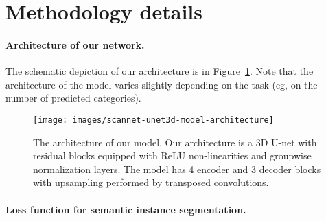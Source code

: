 \section{Methodology details}
\label{supsec:methods-detail}



\paragraph{Architecture of our network. }
\label{methods:network-arch-detail}
The schematic depiction of our architecture is in Figure~\ref{fig:architecture}. Note that the architecture of the model varies slightly depending on the task (eg, on the number of predicted categories). 


\begin{figure}[!t]
\label{fig:architecture}
\centering
\texttt{[image: images/scannet-unet3d-model-architecture]}
\caption{The architecture of our model. Our architecture is a 3D U-net with residual blocks equipped with ReLU non-linearities and groupwise normalization layers. The model has 4 encoder and 3 decoder blocks with upsampling performed by transposed convolutions.}
\end{figure}









\paragraph{Loss function for semantic instance segmentation. }
\label{methods:loss-detail}

